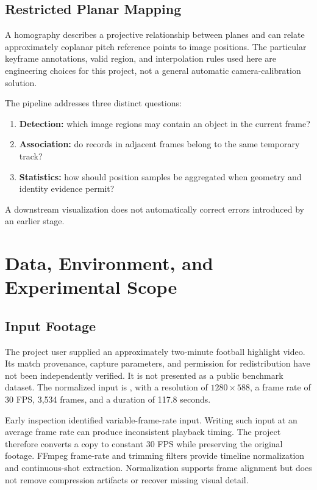 \documentclass[11pt,a4paper]{article}
\begin{document}
\subsection{Restricted Planar Mapping}

A homography describes a projective relationship between planes and can relate
approximately coplanar pitch reference points to image positions\cite{opencv}.
The particular keyframe annotations, valid region, and interpolation rules used
here are engineering choices for this project, not a general automatic
camera-calibration solution.

The pipeline addresses three distinct questions:
\begin{enumerate}
  \item \textbf{Detection:} which image regions may contain an object in the
        current frame?
  \item \textbf{Association:} do records in adjacent frames belong to the same
        temporary track?
  \item \textbf{Statistics:} how should position samples be aggregated when
        geometry and identity evidence permit?
\end{enumerate}
A downstream visualization does not automatically correct errors introduced
by an earlier stage.

\section{Data, Environment, and Experimental Scope}

\subsection{Input Footage}

The project user supplied an approximately two-minute football highlight video.
Its match provenance, capture parameters, and permission for redistribution
have not been independently verified. It is not presented as a public benchmark
dataset. The normalized input is , with a resolution
of $1280\times588$, a frame rate of 30 FPS, 3,534 frames, and a duration of
117.8 seconds.

Early inspection identified variable-frame-rate input. Writing such input at
an average frame rate can produce inconsistent playback timing. The project
therefore converts a copy to constant 30 FPS while preserving the original
footage. FFmpeg frame-rate and trimming filters provide timeline normalization
and continuous-shot extraction\cite{ffmpeg}. Normalization supports frame
alignment but does not remove compression artifacts or recover missing
visual detail.
\end{document}
